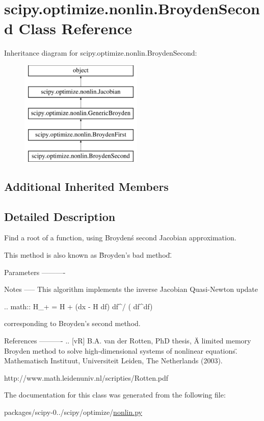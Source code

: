 \hypertarget{classscipy_1_1optimize_1_1nonlin_1_1BroydenSecond}{}\section{scipy.\+optimize.\+nonlin.\+Broyden\+Second Class Reference}
\label{classscipy_1_1optimize_1_1nonlin_1_1BroydenSecond}
Inheritance diagram for scipy.\+optimize.\+nonlin.\+Broyden\+Second\+:\begin{figure}[H]
\begin{center}
\leavevmode
\includegraphics[height=5.000000cm]{classscipy_1_1optimize_1_1nonlin_1_1BroydenSecond}
\end{center}
\end{figure}
\subsection*{Additional Inherited Members}


\subsection{Detailed Description}
\begin{DoxyVerb}Find a root of a function, using Broyden\'s second Jacobian approximation.

This method is also known as \"Broyden's bad method\".

Parameters
----------

Notes
-----
This algorithm implements the inverse Jacobian Quasi-Newton update

.. math:: H_+ = H + (dx - H df) df^\dagger / ( df^\dagger df)

corresponding to Broyden's second method.

References
----------
.. [vR] B.A. van der Rotten, PhD thesis,
   \"A limited memory Broyden method to solve high-dimensional
   systems of nonlinear equations\". Mathematisch Instituut,
   Universiteit Leiden, The Netherlands (2003).

   http://www.math.leidenuniv.nl/scripties/Rotten.pdf\end{DoxyVerb}
 

The documentation for this class was generated from the following file\+:\begin{DoxyCompactItemize}
\item 
packages/scipy-\/0../scipy/optimize/\hyperlink{nonlin_8py}{nonlin.\+py}\end{DoxyCompactItemize}

